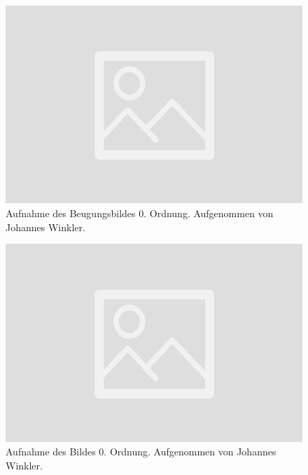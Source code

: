 \documentclass{article}
\begin{document}
\begin{minipage}[t]{.45\textwidth}
\begin{figure}[H]
\includegraphics[scale=0.1]{jw/Beugungsbild_0.jpg}
\caption{Aufnahme des Beugungsbildes 0. Ordnung. Aufgenommen von Johannes Winkler.}
\label{fig:bbild_0_jw}
\end{figure}
\end{minipage}
\hfill
\noindent
\begin{minipage}[t]{.45\textwidth}
\begin{figure}[H]
\includegraphics[scale=0.1]{jw/Bild_0.jpg}
\caption{Aufnahme des Bildes 0. Ordnung. Aufgenommen von Johannes Winkler.}\label{fig:bild_0_jw}
\end{figure}
\end{minipage}
\end{document}
